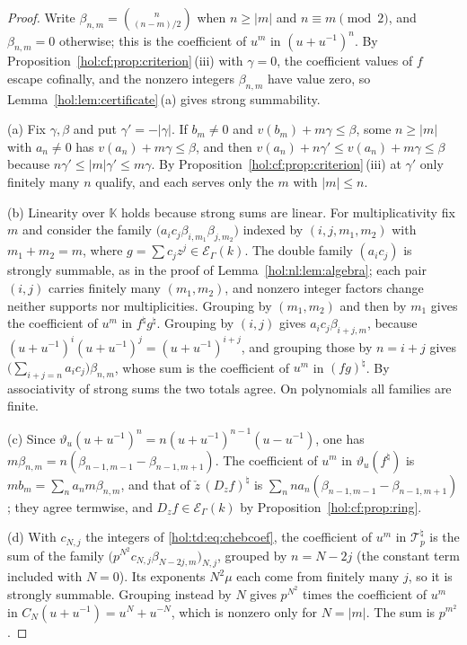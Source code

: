 \documentclass[11pt]{article}
\numberwithin{equation}{section}
\theoremstyle{definition}
\theoremstyle{remark}
\newcommand{\abs}[1]{\lvert#1\rvert}
\newcommand{\KK}{\mathbb K}
\newcommand{\EK}{\mathcal E_\Gamma(k)}
\begin{document}
\begin{proof}
Write $\beta_{n,m}=\binom n{(n-m)/2}$ when $n\ge\abs m$ and $n\equiv m\pmod
2$, and $\beta_{n,m}=0$ otherwise; this is the coefficient of $u^m$ in
$(u+u^{-1})^n$. By Proposition~\ref{hol:cf:prop:criterion}\,(iii) with
$\gamma=0$, the coefficient values of $f$ escape cofinally, and the nonzero
integers $\beta_{n,m}$ have value zero, so Lemma~\ref{hol:lem:certificate}\,(a)
gives strong summability.

(a) Fix $\gamma,\beta$ and put $\gamma'=-\abs\gamma$. If $b_m\ne0$ and
$v(b_m)+m\gamma\le\beta$, some $n\ge\abs m$ with $a_n\ne0$ has
$v(a_n)+m\gamma\le\beta$, and then
$v(a_n)+n\gamma'\le v(a_n)+m\gamma\le\beta$ because $n\gamma'\le\abs
m\gamma'\le m\gamma$. By Proposition~\ref{hol:cf:prop:criterion}\,(iii) at
$\gamma'$ only finitely many $n$ qualify, and each serves only the $m$ with
$\abs m\le n$.

(b) Linearity over $\KK$ holds because strong sums are linear. For
multiplicativity fix $m$ and consider the family
$\bigl(a_ic_j\beta_{i,m_1}\beta_{j,m_2}\bigr)$ indexed by $(i,j,m_1,m_2)$
with $m_1+m_2=m$, where $g=\sum c_jz^j\in\EK$. The double family $(a_ic_j)$ is
strongly summable, as in the proof of Lemma~\ref{hol:nl:lem:algebra}; each
pair $(i,j)$ carries finitely many $(m_1,m_2)$, and nonzero integer factors
change neither supports nor multiplicities. Grouping by $(m_1,m_2)$ and then by
$m_1$ gives the coefficient of $u^m$ in $f^\natural g^\natural$. Grouping by
$(i,j)$ gives $a_ic_j\beta_{i+j,m}$, because
$(u+u^{-1})^i(u+u^{-1})^j=(u+u^{-1})^{i+j}$, and grouping those by $n=i+j$
gives $\bigl(\sum_{i+j=n}a_ic_j\bigr)\beta_{n,m}$, whose sum is the coefficient
of $u^m$ in $(fg)^\natural$. By associativity of strong sums the two totals
agree. On polynomials all families are finite.

(c) Since $\vartheta_u(u+u^{-1})^n=n(u+u^{-1})^{n-1}(u-u^{-1})$, one has
$m\beta_{n,m}=n(\beta_{n-1,m-1}-\beta_{n-1,m+1})$. The coefficient of $u^m$
in $\vartheta_u(f^\natural)$ is $mb_m=\sum_na_nm\beta_{n,m}$, and that of
$\check z\,(D_zf)^\natural$ is
$\sum_nna_n(\beta_{n-1,m-1}-\beta_{n-1,m+1})$; they agree termwise, and
$D_zf\in\EK$ by Proposition~\ref{hol:cf:prop:ring}.

(d) With $c_{N,j}$ the integers of \eqref{hol:td:eq:chebcoef}, the coefficient
of $u^m$ in $\mathcal T_p^\natural$ is the sum of the family
$\bigl(p^{N^2}c_{N,j}\beta_{N-2j,m}\bigr)_{N,j}$, grouped by $n=N-2j$ (the
constant term included with $N=0$). Its exponents $N^2\mu$ each come from
finitely many $j$, so it is strongly summable. Grouping instead by $N$ gives
$p^{N^2}$ times the coefficient of $u^m$ in $C_N(u+u^{-1})=u^N+u^{-N}$,
which is nonzero only for $N=\abs m$. The sum is $p^{m^2}$.
\end{proof}
\end{document}
